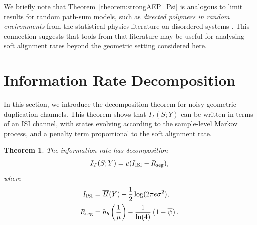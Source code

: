 \documentclass[onecolumn]{IEEEtran}
\newtheorem{theorem}{Theorem}
\theoremstyle{definition}
\begin{document}
We briefly note that Theorem~\ref{theorem:strongAEP_Psi} is analogous to limit results for random path-sum models, such as {\em directed polymers in random environments} from the statistical physics literature on disordered systems \cite{Zygouras2024}. This connection suggests that tools from that literature may be useful for analysing soft alignment rates beyond the geometric setting
considered here.


\section{Information Rate Decomposition}\label{sec:decomposition}

In this section, we introduce the decomposition theorem for noisy geometric duplication channels. This theorem shows that $I_T(S;Y)$ can be written in terms of an ISI channel, with states evolving according to the sample-level Markov process, and a penalty term proportional to the soft alignment rate.
\begin{theorem} \label{theorem:decomp}
The information rate has decomposition
    \begin{align}
        I_T(S;Y) = \mu (I_{\rm ISI} - R_{\rm seg}), \label{eq:I_T_S_Y}
    \end{align}
    where 
\begin{align}
    I_{\rm ISI} &= \overline{H}(Y) - \frac{1}{2}\log(2\pi e \sigma^2),\\
    R_{\rm seg} &= h_b\left(\frac{1}{\mu}\right) - \frac{1}{\ln(4)}\left(1- \overline{\psi}\right) .
\end{align}
\end{theorem}
\end{document}
